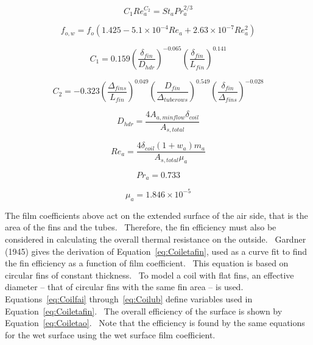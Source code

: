 \begin{equation}
  C_1 Re_a^{C_2} = St_a Pr_a^{2/3}
\label{eq:CoilC1Rea}
\end{equation}

\begin{equation}
{f_{o,w}} = {f_o}\left( {1.425 - 5.1 \times {{10}^{ - 4}}R{e_a} + 2.63 \times {{10}^{ - 7}}Re_a^2} \right)
\label{eq:Coilfow}
\end{equation}

\begin{equation}
{C_1} = 0.159{\left( {\frac{{{\delta_{fin}}}}{{{D_{hdr}}}}} \right)^{ - 0.065}}{\left( {\frac{{{\delta_{fin}}}}{{{L_{fin}}}}} \right)^{0.141}}
\label{eq:CoilC1}
\end{equation}

\begin{equation}
{C_2} =  - 0.323{\left( {\frac{{{\Delta_{fins}}}}{{{L_{fin}}}}} \right)^{0.049}}{\left( {\frac{{{D_{fin}}}}{{{\Delta_{tuberows}}}}} \right)^{0.549}}{\left( {\frac{{{\delta_{fin}}}}{{{\Delta_{fins}}}}} \right)^{ - 0.028}}
\label{eq:CoilC2}
\end{equation}

\begin{equation}
{D_{hdr}} = \frac{{4{A_{a,minflow}}{\delta_{coil}}}}{{{A_{s,total}}}}
\label{eq:CoilDhdr}
\end{equation}

\begin{equation}
R{e_a} = \frac{{4{\delta_{coil}}\left( {1 + {w_a}} \right){m_a}}}{{{A_{s,total}}{\mu_a}}}
\end{equation}

\begin{equation}
P{r_a} = 0.733
\end{equation}

\begin{equation}
{\mu_a} = 1.846 \times {10^{ - 5}}
\label{eq:Coilmua}
\end{equation}

The film coefficients above act on the extended surface of the air side, that is the area of the fins and the tubes.~ Therefore, the fin efficiency must also be considered in calculating the overall thermal resistance on the outside.~ Gardner (1945) gives the derivation of Equation~\ref{eq:Coiletafin}, used as a curve fit to find the fin efficiency as a function of film coefficient.~ This equation is based on circular fins of constant thickness.~ To model a coil with flat fins, an effective diameter -- that of circular fins with the same fin area -- is used.~ Equations~\ref{eq:Coilfai} through~\ref{eq:Coilub} define variables used in Equation~\ref{eq:Coiletafin}.~ The overall efficiency of the surface is shown by Equation~\ref{eq:Coiletao}.~ Note that the efficiency is found by the same equations for the wet surface using the wet surface film coefficient.

